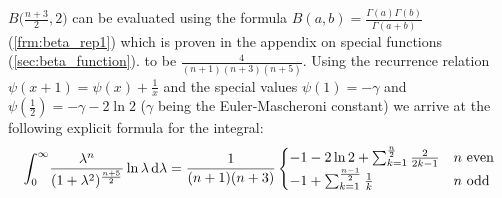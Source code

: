 $B\bigl(\tfrac{n+3}{2}, 2\bigr)$ can be evaluated using the formula $B(a,b) =
\tfrac{\Gamma(a)\Gamma(b)}{\Gamma(a+b)}$ (\ref{frm:beta_rep1}) which is proven
in the appendix on special functions (\ref{sec:beta_function}).
to be $\tfrac{4}{(n+1)(n+3)(n+5)}$. Using the recurrence relation $\psi(x + 1) =
\psi(x) + \tfrac{1}{x}$ and the special values $\psi(1) = -\gamma$ and
$\psi(\tfrac{1}{2}) = -\gamma - 2\ln 2$ ($\gamma$ being the Euler-Mascheroni
constant) we arrive at the following explicit formula for the integral:
\begin{align*}
    \Integ[\infty]{0}{\lambda}{\frac{\lambda^n}{(1 +
    \lambda^2)^{\frac{n+5}{2}}}\ln{\lambda}} = \frac{1}{(n+1)(n+3)}
        \begin{cases} 
            -1 - 2\ln 2 + \sum_{k=1}^{\frac n 2}\frac{2}{2k - 1} & n\text{
            even} \\
            -1 + \sum_{k=1}^{\frac{n-1}{2}}\frac 1 k & n\text{ odd}
        \end{cases}
\end{align*}
